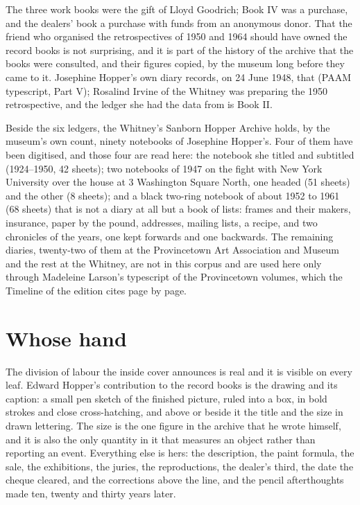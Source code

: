The three work books were the gift of Lloyd Goodrich; Book IV was a purchase, and the dealers' book a purchase with funds from an anonymous donor. That the friend who organised the retrospectives of 1950 and 1964 should have owned the record books is not surprising, and it is part of the history of the archive that the books were consulted, and their figures copied, by the museum long before they came to it. Josephine Hopper's own diary records, on 24 June 1948, that  (PAAM typescript, Part V); Rosalind Irvine of the Whitney was preparing the 1950 retrospective, and the ledger she had the data from is Book II.

Beside the six ledgers, the Whitney's Sanborn Hopper Archive holds, by the museum's own count, ninety notebooks of Josephine Hopper's. Four of them have been digitised, and those four are read here: the notebook she titled  and subtitled  (1924--1950, 42 sheets); two notebooks of 1947 on the fight with New York University over the house at 3 Washington Square North, one headed  (51 sheets) and the other  (8 sheets); and a black two-ring notebook of about 1952 to 1961 (68 sheets) that is not a diary at all but a book of lists: frames and their makers, insurance, paper by the pound, addresses, mailing lists, a recipe, and two chronicles of the years, one kept forwards and one backwards. The remaining diaries, twenty-two of them at the Provincetown Art Association and Museum and the rest at the Whitney, are not in this corpus and are used here only through Madeleine Larson's typescript of the Provincetown volumes, which the Timeline of the edition cites page by page.

\section{Whose hand}

The division of labour the inside cover announces is real and it is visible on every leaf. Edward Hopper's contribution to the record books is the drawing and its caption: a small pen sketch of the finished picture, ruled into a box, in bold strokes and close cross-hatching, and above or beside it the title and the size in drawn lettering. The size is the one figure in the archive that he wrote himself, and it is also the only quantity in it that measures an object rather than reporting an event. Everything else is hers: the description, the paint formula, the sale, the exhibitions, the juries, the reproductions, the dealer's third, the date the cheque cleared, and the corrections above the line, and the pencil afterthoughts made ten, twenty and thirty years later.

